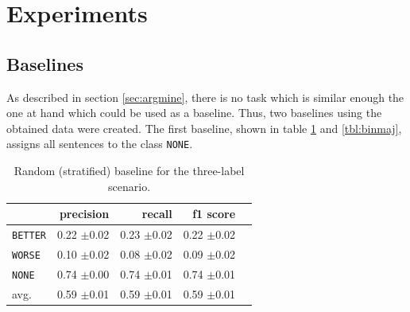 \section{Experiments}
\subsection{Baselines}
\label{sec:3_baseline}
As described in section \ref{sec:argmine}, there is no task which is similar enough the one at hand which could be used as a baseline. Thus, two baselines using the obtained data were created. The first baseline, shown in table \ref{tbl:3stratifiedbaseline} and \ref{tbl:binmaj}, assigns all sentences to the class \texttt{NONE}.

\begin{table}[!htb]
	\begin{minipage}{.5\linewidth}
		\caption{Random (stratified) baseline for the three-label scenario.}
		\label{tbl:3stratifiedbaseline}
		\centering
		      
		\begin{tabularx}{0.97\linewidth}{Xrrrr}
			\toprule
			                & precision                    & recall                       & f1 score                     \\ \midrule 
			\texttt{BETTER} & 0.22 \scriptsize{$\pm$0.02} & 0.23 \scriptsize{$\pm$0.02} & 0.22 \scriptsize{$\pm$0.02} \\ 
			\texttt{WORSE}  & 0.10 \scriptsize{$\pm$0.02} & 0.08 \scriptsize{$\pm$0.02} & 0.09 \scriptsize{$\pm$0.02} \\ 
			\texttt{NONE}   & 0.74 \scriptsize{$\pm$0.00}  & 0.74 \scriptsize{$\pm$0.01} & 0.74 \scriptsize{$\pm$0.01} \\ 
			avg.         & 0.59 \scriptsize{$\pm$0.01} & 0.59 \scriptsize{$\pm$0.01} & 0.59 \scriptsize{$\pm$0.01} \\ 
			\bottomrule
		\end{tabularx} 
		

\end{minipage}
\end{table}

